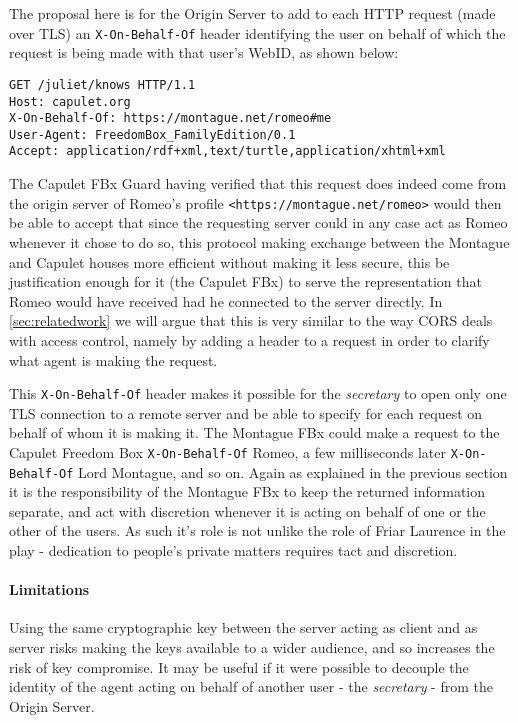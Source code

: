 \documentclass[a4paper]{llncs}
\begin{document}
The proposal here is for the Origin Server to add to each HTTP request (made over TLS) an \lstinline|X-On-Behalf-Of| header identifying the user on behalf of which the request is being made with that user's WebID, as shown below:

\begin{verbatim}
GET /juliet/knows HTTP/1.1
Host: capulet.org
X-On-Behalf-Of: https://montague.net/romeo#me
User-Agent: FreedomBox_FamilyEdition/0.1 
Accept: application/rdf+xml,text/turtle,application/xhtml+xml
\end{verbatim}

The Capulet FBx Guard having verified that this request does indeed come from the origin server of Romeo's profile
\lstinline|<https://montague.net/romeo>| would then be able to accept that since the requesting server could in any case act as Romeo whenever it chose to do so, this protocol making exchange between the Montague and Capulet houses more efficient without making it less secure, this be justification enough for it (the Capulet FBx) to  serve the representation that Romeo would have received had he connected to the server directly.  
In \autoref{sec:relatedwork} we will argue that this is very similar to the way CORS deals with access control, namely by adding a header to a request in order to clarify what agent is making the request.

This \lstinline|X-On-Behalf-Of| header makes it possible for the \textit{secretary} to open only one TLS connection to a remote server and be 
able to specify for each request on behalf of whom it is making it. The Montague FBx could make a request to the Capulet Freedom Box \lstinline|X-On-Behalf-Of| Romeo, a few milliseconds later \lstinline|X-On-Behalf-Of| Lord Montague, and so on. 
Again as explained in the previous section it is the responsibility of the Montague FBx to keep the returned information separate, and act with discretion whenever it is acting on behalf of one or the other of the users. 
As such it's role is not unlike the role of Friar Laurence in the play - dedication to people's private matters requires tact and discretion.

\paragraph{Limitations}

Using the same cryptographic key between the server acting as client and as server risks making the keys available to a wider audience, and so increases the risk of key compromise. 
It may be useful if it were possible to decouple the identity of the agent acting on behalf of another user - the \textit{secretary} - from the Origin Server.
\end{document}
